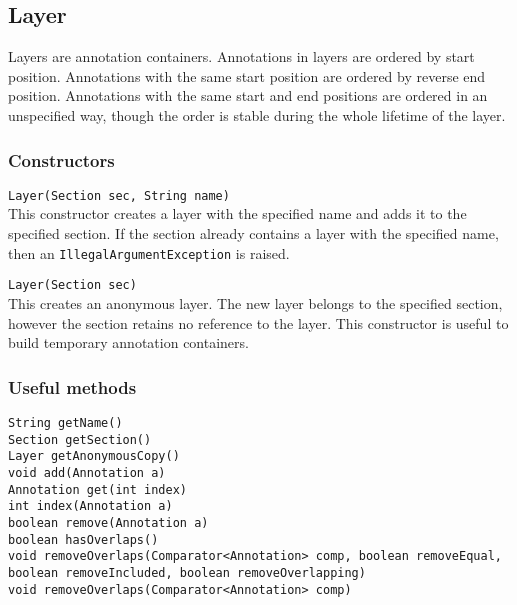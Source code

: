 \documentclass[a4paper]{article}
\begin{document}
\subsection{Layer}
Layers are annotation containers.
Annotations in layers are ordered by start position.
Annotations with the same start position are ordered by reverse end position.
Annotations with the same start and end positions are ordered in an unspecified way, though the order is stable during the whole lifetime of the layer.

\subsubsection{Constructors}

\texttt{Layer(Section sec, String name)}\\
This constructor creates a layer with the specified name and adds it to the specified section.
If the section already contains a layer with the specified name, then an \texttt{IllegalArgumentException} is raised.

\texttt{Layer(Section sec)}\\
This creates an anonymous layer.
The new layer belongs to the specified section, however the section retains no reference to the layer.
This constructor is useful to build temporary annotation containers.

\subsubsection{Useful methods}

\texttt{String getName()}\\
\texttt{Section getSection()}\\

\texttt{Layer getAnonymousCopy()}\\

\texttt{void add(Annotation a)}\\
\texttt{Annotation get(int index)}\\
\texttt{int index(Annotation a)}\\
\texttt{boolean remove(Annotation a)}\\

\texttt{boolean hasOverlaps()}\\
\texttt{void removeOverlaps(Comparator<Annotation> comp, boolean removeEqual, boolean removeIncluded, boolean removeOverlapping)}\\
\texttt{void removeOverlaps(Comparator<Annotation> comp)}\\
\end{document}
